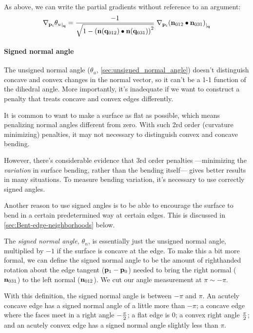 As above, we can write the partial gradients without reference to an argument:
\begin{equation}
{\mathbf \nabla}_{{\mathbf p}_i}{{\theta_u}}_{\mid_{{\mathbf q}}}
=
{ -1 \over \sqrt{1 - \left( {\mathbf n}({\mathbf q}_{012}) \bullet {\mathbf n}({\mathbf q}_{031}) \right)^2} }
\; {\mathbf \nabla}_{{\mathbf p}_i}{{\left({\mathbf n}_{012}\bullet{\mathbf n}_{031}\right)}}_{\mid_{{\mathbf q}}}
\end{equation}


\paragraph{Signed normal angle}
\label{sec:signed_normal_angle}

The unsigned normal angle
($\theta_u$, \autoref{sec:unsigned_normal_angle})
doesn't distinguish concave and convex changes in the normal vector,
so it can't be a 1-1 function of the dihedral angle.
More importantly, it's inadequate if we want to construct
a penalty that treats concave and convex edges differently.

It is common to want to make a surface as flat as possible,
which means penalizing normal angles different from zero.
With such 2rd order (curvature minimizing) penalties, 
it may not necessary to distinguish
convex and concave bending.

However, there's considerable evidence that
$3$rd order penalties ---minimizing the {\it variation}
in surface bending, rather than the bending itself---
gives better results in many situations.
To measure bending variation, it's necessary
to use correctly signed angles.

Another reason to use signed angles is to be able
to encourage the surface to bend in a certain
predetermined way at certain edges.
This is discussed in \autoref{sec:Bent-edge-neighborhoods}
below.

The {\it signed normal angle,} $\theta_n$,
is essentially just the
unsigned normal angle, multiplied by $-1$ if the surface is
concave at the edge.
To make this a bit more formal,
we can define the signed normal angle to be the amount
of righthanded rotation about the edge tangent (${\mathbf p}_1 - {\mathbf p}_0$)
needed to bring the right normal (${\mathbf n}_{031}$) to
the left normal (${\mathbf n}_{012}$).
We cut our angle measurement at $\pi \sim -\pi$.

With this definition, the signed normal angle
is between $-\pi$ and $\pi$.
An acutely concave edge has a signed normal angle
of a little more than $-\pi$;
a concave edge where the faces meet in a right angle
$-{\pi \over 2}$;
a flat edge is $0$;
a convex right angle $\pi \over 2$;
and an acutely convex edge has a signed normal angle
slightly less than $\pi$.

